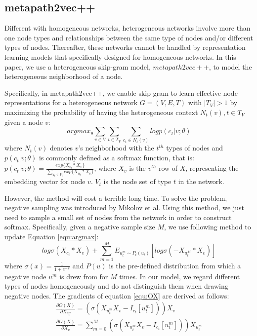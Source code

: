 \documentclass[conference]{IEEEtran}
\begin{document}
\subsection{metapath2vec++}
Different with homogeneous networks, heterogeneous networks involve more than one node types and relationships between the same type of nodes and/or different types of nodes. Thereafter, these networks cannot be handled by representation learning models that specifically designed for homogeneous networks. In this paper, we use a heterogeneous skip-gram model, $metapath2vec++$, to model the heterogeneous neighborhood of a node.

Specifically, in metapath2vec++, we enable skip-gram to learn effective node representations for a heterogeneous network $G=(V,E,T)$ with $|T_V|>1$ by maximizing the probability of having the heterogeneous context $N_t(v),t\in T_V$ given a node $v$:
\begin{equation}
	arg max_{\theta}\sum_{v\in V}\sum_{t\in T_V}\sum_{c_t\in N_t(v)} log p(c_t|v;\theta)
\label{equ:argmax}
\end{equation}
where $N_t(v)$ denotes $v$'s neighborhood with the $t^{th}$ types of nodes and $p(c_t|v;\theta)$ is commonly defined as a softmax function, that is: $p(c_t|v;\theta)=\frac{exp\{X_{c_t}*X_v\}}{\sum_{u_t\in V_t}exp\{X_{u_t}*X_v\}}$, where $X_v$ is the $v^{th}$ row of $X$, representing the embedding vector for node $v$. $V_t$ is the node set of type $t$ in the network.

However, the method will cost a terrible long time. To solve the problem, negative sampling was introduced by Mikolov et al. Using this method, we just need to sample a small set of nodes from the network in order to construct softmax. Specifically, given a negative sample size $M$, we use following method to update Equation \ref{equ:argmax}:
\begin{equation}
log \sigma(X_{c_t}*X_v)+\sum_{m=1}^M E_{u_t^m\sim P_t(u_t)}[log \sigma(-X_{u_t^M}*X_v)]
\label{equ:OX}
\end{equation}
where $\sigma(x)=\frac{1}{1+e^{-x}}$ and $P(u)$ is the pre-defined distribution from which a negative node $u^m$ is drew from for $M$ times. In our model, we regard different types of nodes homogeneously and do not distinguish them when drawing negative nodes. The gradients of equation \ref{equ:OX} are derived as follows:
\begin{equation}\label{equ:gradient}
\begin{split}
\frac{\partial O(X)}{\partial X_{u_t^m}}=(\sigma(X_{u_t^m}X_v-I_{c_t}[u_t^m]))X_v\\
\frac{\partial O(X)}{\partial X_v}=\sum_{m=0}^M(\sigma(X_{u_t^m}X_v-I_{c_t}[u_t^m]))X_{u_t^m}
\end{split}
\end{equation}
\end{document}
